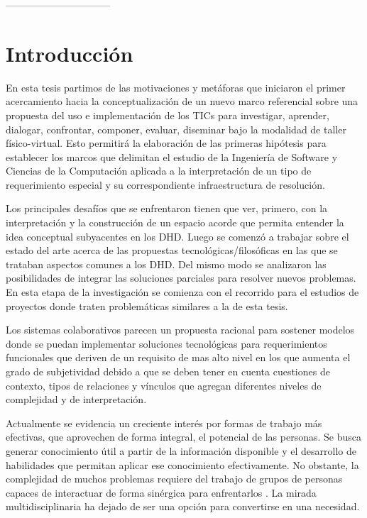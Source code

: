 --------------------------------
\parskip=0.6cm

\chapter{Introducción}


En esta tesis partimos de las motivaciones y metáforas que
iniciaron el primer
acercamiento hacia la conceptualización de un nuevo marco referencial sobre una
propuesta del uso e implementación de los TICs para investigar, aprender,
dialogar, confrontar, componer, evaluar, diseminar bajo la modalidad de taller
físico-virtual. Esto permitirá la elaboración de las primeras hipótesis
para establecer los marcos que delimitan el estudio de la Ingeniería de
Software y Ciencias de la Computación aplicada a la interpretación de un tipo
de requerimiento especial y su correspondiente infraestructura de resolución.


Los principales desafíos que se enfrentaron tienen que ver, primero, con
la interpretación y la construcción de un espacio acorde que permita entender
la idea conceptual subyacentes en los DHD. Luego se comenzó a trabajar sobre
el estado del arte acerca de las propuestas tecnológicas/filosóficas en
las que se trataban aspectos comunes a los DHD. Del mismo modo se analizaron las
posibilidades de integrar las soluciones parciales para resolver nuevos
problemas. En esta etapa de la investigación se comienza con el recorrido
para el estudios de proyectos donde traten problemáticas similares a la de
esta tesis.

Los sistemas colaborativos parecen un propuesta racional para sostener modelos
donde se puedan implementar soluciones tecnológicas para requerimientos
funcionales que deriven de un requisito de mas alto nivel en los que aumenta
el grado de subjetividad debido a que se deben tener en cuenta cuestiones de
contexto, tipos de relaciones y vínculos que agregan diferentes niveles de
complejidad y de interpretación. 

Actualmente se evidencia un creciente
interés por formas de trabajo más
efectivas, que aprovechen de forma
integral, el potencial de las personas. Se
busca generar conocimiento útil a partir de
la información disponible y el desarrollo de
habilidades que permitan aplicar ese
conocimiento efectivamente. No obstante,
la complejidad de muchos problemas
requiere del trabajo de grupos de
personas capaces de interactuar de forma
sinérgica para enfrentarlos \cite{cap1.1}. La mirada
multidisciplinaria ha dejado de ser una
opción para convertirse en una necesidad. 

